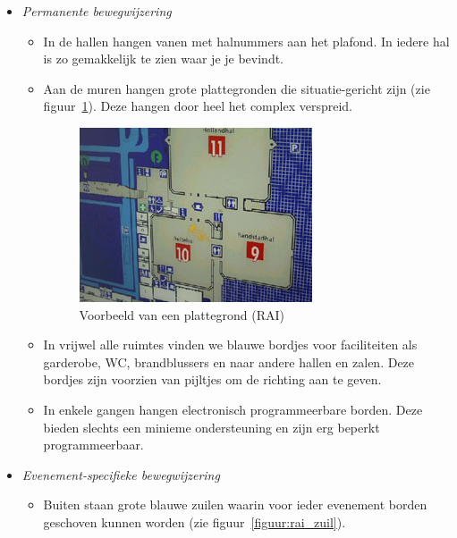 \begin{itemize}

\item \emph{Permanente bewegwijzering}

\begin{itemize}
\item In de hallen hangen vanen met halnummers aan het plafond. In iedere hal is zo gemakkelijk te zien waar je je bevindt.
\item Aan de muren hangen grote plattegronden die situatie-gericht zijn (zie figuur~\ref{figuur:rai_plattegrond}). Deze hangen door heel het complex verspreid.

\begin{figure}
\begin{center}
\includegraphics{images/rai_plattegrond.jpg}
\end{center}
\caption{Voorbeeld van een plattegrond (RAI)}
\label{figuur:rai_plattegrond}
\end{figure}

\item In vrijwel alle ruimtes vinden we blauwe bordjes voor faciliteiten als garderobe, WC, brandblussers en naar andere hallen en zalen. Deze bordjes zijn voorzien van pijltjes om de richting aan te geven.
\item In enkele gangen hangen electronisch programmeerbare borden. Deze bieden slechts een minieme ondersteuning en zijn erg beperkt programmeerbaar.
\end{itemize}

\item \emph{Evenement-specifieke bewegwijzering}

\begin{itemize}
\item Buiten staan grote blauwe zuilen waarin voor ieder evenement borden geschoven kunnen worden (zie figuur~\ref{figuur:rai_zuil}).


\end{itemize}
\end{itemize}
